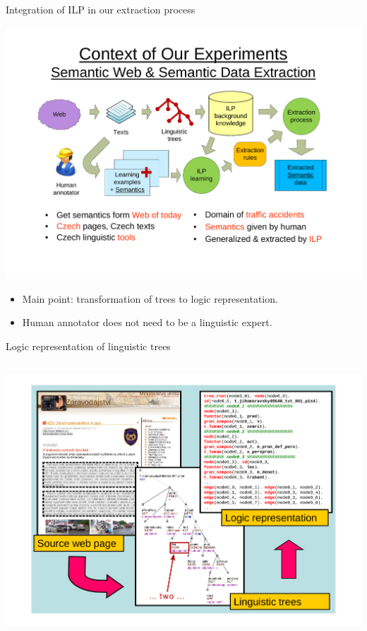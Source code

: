 \documentclass[xcolor=dvipsnames]{beamer}
\begin{document}
\begin{frame}{Integration of ILP in our extraction process}
\begin{center}
\includegraphics[width=0.45\vsize, angle=-90]{img/ILP_IE_process}
\end{center}
\begin{itemize}
	\item Main point: transformation of trees to \alert{logic representation}. 
	\item Human annotator does \alert{not} need to be a linguistic \alert{expert}.
\end{itemize}
\end{frame}

\begin{frame}{Logic representation of linguistic trees}
\begin{columns}
\column{\textwidth}
\centerline{\includegraphics[height=0.9\hsize, angle=-90]{img/LogicRepresentation}}
\end{columns}
\end{frame}
\end{document}

